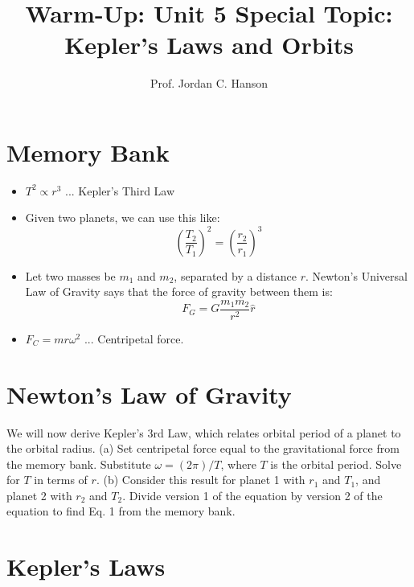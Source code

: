 \documentclass{article}
\begin{document}
\title{Warm-Up: Unit 5 Special Topic: Kepler's Laws and Orbits}
\author{Prof. Jordan C. Hanson}

\maketitle

\section{Memory Bank}

\begin{itemize}
\item $T^2 \propto r^3$ ... Kepler's Third Law
\item Given two planets, we can use this like:
\begin{equation}
\left(\frac{T_2}{T_1}\right)^2 = \left(\frac{r_2}{r_1}\right)^3 \label{eq:orb}
\end{equation}
\item Let two masses be $m_1$ and $m_2$, separated by a distance $r$.  Newton's Universal Law of Gravity says that the force of gravity between them is:
\begin{equation}
F_G = G \frac{m_1 m_2}{r^2}\hat{r}
\end{equation}
\item $F_C = m r \omega^2$ ... Centripetal force.
\end{itemize}

\section{Newton's Law of Gravity}

We will now derive Kepler's 3rd Law, which relates orbital period of a planet to the orbital radius.  (a) Set centripetal force equal to the gravitational force from the memory bank.  Substitute $\omega = (2\pi)/T$, where $T$ is the orbital period. Solve for $T$ in terms of $r$. (b) Consider this result for planet 1 with $r_1$ and $T_1$, and planet 2 with $r_2$ and $T_2$.  Divide version 1 of the equation by version 2 of the equation to find Eq. 1 from the memory bank.

\section{Kepler's Laws}
\end{document}

